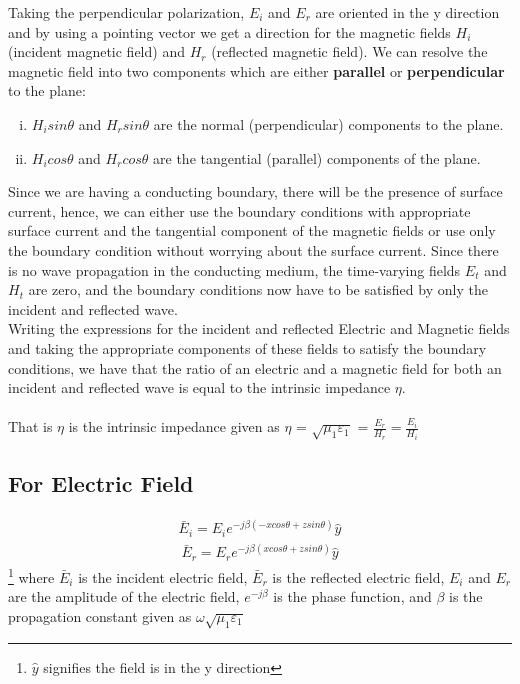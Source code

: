 Taking the perpendicular polarization, $E_i$ and $E_r$ are oriented in the y direction and by using a pointing vector we get a direction for the magnetic fields $H_i$ (incident magnetic field) and $H_r$ (reflected magnetic field). We can resolve the magnetic field into two
components which are either \textbf{parallel} or \textbf{perpendicular} to the plane:
\begin{enumerate}[(i)]
\item $ H_isin\theta $ and $ H_rsin\theta $  are the normal (perpendicular) components to the plane.
\item $ H_icos\theta $ and $ H_rcos\theta $ are the tangential (parallel) components of the plane.
\end{enumerate}
Since we are having a conducting boundary, there will be the presence of surface current, hence, we can either use the boundary conditions with appropriate surface current and the tangential component of the magnetic fields or use only the boundary condition without worrying about the surface current. Since there is no wave propagation in the conducting medium, the time-varying fields $E_t$ and $H_t$ are zero, and the boundary conditions now have to be satisfied by only the incident and reflected wave.\\ 
Writing the expressions for the incident and reflected Electric and Magnetic fields and taking the appropriate components of these fields
to satisfy the boundary conditions, we have that the ratio of an electric and a magnetic field for both an incident and reflected wave is equal to the intrinsic impedance $\eta $.\\\\ 
That is $ \eta $ is the intrinsic impedance given as $\eta $ = $\sqrt{\mu_1 \varepsilon_1 }$ = $\frac{E_r}{H_r} = \frac{E_i}{H_i}$
\subsection{For Electric Field}
\begin{align}
\bar{E}_i = E_i e^{-j\beta(-xcos\theta + zsin\theta)} \hat{y}
\label{eqn:elecincid}
\end{align}
\begin{align}
\bar{E}_r =E_r  e^{-j\beta ( xcos\theta + zsin\theta)} \hat{y}
\label{eqn:elecref}
\end{align}\footnote{$\hat{y}$ signifies the field is in the y direction}
where $\bar{E}_i$ is the incident electric field, $\bar{E}_r$ is the reflected electric field, $E_i$ and $E_r$ are the amplitude of the electric field, $e^{-j\beta}$ is the phase function, and $\beta$ is the propagation constant given as $\omega \sqrt{\mu_1\varepsilon_1}$ 

